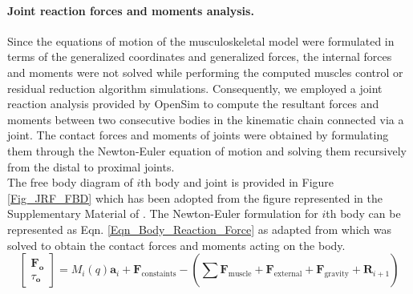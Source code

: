\documentclass[10pt,letterpaper]{article}
\begin{document}
\paragraph{Joint reaction forces and moments analysis.} Since the equations of motion of the musculoskeletal model were formulated in terms of the generalized coordinates and generalized forces, the internal forces and moments were not solved while performing the computed muscles control or residual reduction algorithm simulations. Consequently, we employed a joint reaction analysis provided by OpenSim to compute the resultant forces and moments between two consecutive bodies in the kinematic chain connected via a joint. The contact forces and moments of joints were obtained by formulating them through the Newton-Euler equation of motion and solving them recursively from the distal to proximal joints.\\
The free body diagram of $i$th body and joint is provided in Figure \ref{Fig_JRF_FBD} which has been adopted from the figure represented in the Supplementary Material of \cite{151}. The Newton-Euler formulation for $i$th body can be represented as Eqn. \eqref{Eqn_Body_Reaction_Force} as adapted from \cite{151} which was solved to obtain the contact forces and moments acting on the body.
\begin{equation}\label{Eqn_Body_Reaction_Force}
\left\lbrack \begin{array}{c}
{\mathit{\mathbf{F}}}_{\mathit{\mathbf{o}}} \\
\tau_{\mathit{\mathbf{o}}} 
\end{array}\right\rbrack =M_i \left(q\right){\mathit{\mathbf{a}}}_i +{\mathit{\mathbf{F}}}_{\mathrm{c}\mathrm{o}\mathrm{n}\mathrm{s}\mathrm{t}\mathrm{a}\mathrm{i}\mathrm{n}\mathrm{t}\mathrm{s}} -\left(\sum_{\;}^{\;} {\mathit{\mathbf{F}}}_{\mathrm{m}\mathrm{u}\mathrm{s}\mathrm{c}\mathrm{l}\mathrm{e}} +{\mathit{\mathbf{F}}}_{\mathrm{e}\mathrm{x}\mathrm{t}\mathrm{e}\mathrm{r}\mathrm{n}\mathrm{a}\mathrm{l}} +{\mathit{\mathbf{F}}}_{\mathrm{g}\mathrm{r}\mathrm{a}\mathrm{v}\mathrm{i}\mathrm{t}\mathrm{y}} +{\mathit{\mathbf{R}}}_{i+1} \right)
\end{equation}
\end{document}
